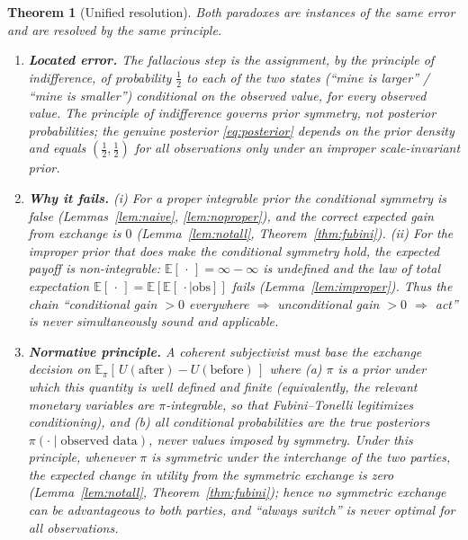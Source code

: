 \documentclass{amsart}
\theoremstyle{plain}
\newtheorem{theorem}{Theorem}
\theoremstyle{definition}
\begin{document}
\begin{theorem}[Unified resolution]\label{thm:unified}
Both paradoxes are instances of the same error and are resolved by the same
principle.
\begin{enumerate}
\item \textbf{Located error.} The fallacious step is the assignment, by the
principle of indifference, of probability $\tfrac12$ to each of the two states
(``mine is larger'' / ``mine is smaller'') \emph{conditional on the observed
value, for every observed value}. The principle of indifference governs prior
symmetry, not posterior probabilities; the genuine posterior \eqref{eq:posterior}
depends on the prior density and equals $(\tfrac12,\tfrac12)$ for all
observations only under an improper scale-invariant prior.
\item \textbf{Why it fails.} (i) For a proper integrable prior the conditional
symmetry is false (Lemmas~\ref{lem:naive}, \ref{lem:noproper}), and the correct
expected gain from exchange is $0$ (Lemma~\ref{lem:notall},
Theorem~\ref{thm:fubini}). (ii) For the improper prior that does make the
conditional symmetry hold, the expected payoff is non-integrable:
$\mathbb E[\,\cdot\,]=\infty-\infty$ is undefined and the law of total
expectation $\mathbb E[\,\cdot\,]=\mathbb E[\mathbb E[\,\cdot\mid\text{obs}]]$
fails (Lemma~\ref{lem:improper}). Thus the chain ``conditional gain $>0$
everywhere $\Rightarrow$ unconditional gain $>0$ $\Rightarrow$ act'' is never
simultaneously sound and applicable.
\item \textbf{Normative principle.} A coherent subjectivist must base the
exchange decision on $\mathbb E_\pi[\,U(\text{after})-U(\text{before})\,]$ where
(a) $\pi$ is a prior under which this quantity is well defined and finite
(equivalently, the relevant monetary variables are $\pi$-integrable, so that
Fubini--Tonelli legitimizes conditioning), and (b) all conditional probabilities
are the true posteriors $\pi(\cdot\mid\text{observed data})$, never values
imposed by symmetry. Under this principle, whenever $\pi$ is symmetric under the
interchange of the two parties, the expected change in utility from the symmetric
exchange is zero (Lemma~\ref{lem:notall}, Theorem~\ref{thm:fubini}); hence no
symmetric exchange can be advantageous to both parties, and ``always switch'' is
never optimal for all observations.
\end{enumerate}
\end{theorem}
\end{document}
